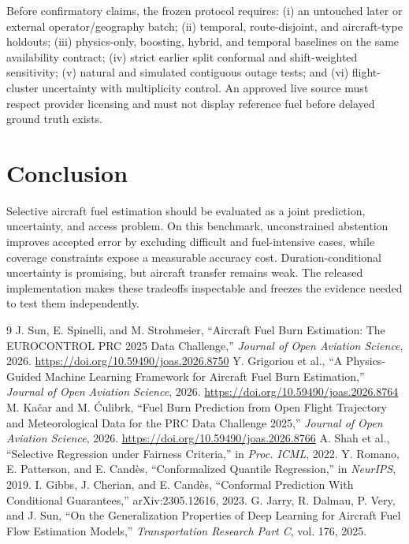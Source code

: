 \documentclass[11pt]{article}
\begin{document}
Before confirmatory claims, the frozen protocol requires: (i) an untouched later or external operator/geography batch; (ii) temporal, route-disjoint, and aircraft-type holdouts; (iii) physics-only, boosting, hybrid, and temporal baselines on the same availability contract; (iv) strict earlier split conformal and shift-weighted sensitivity; (v) natural and simulated contiguous outage tests; and (vi) flight-cluster uncertainty with multiplicity control. An approved live source must respect provider licensing and must not display reference fuel before delayed ground truth exists.

\section{Conclusion}
Selective aircraft fuel estimation should be evaluated as a joint prediction, uncertainty, and access problem. On this benchmark, unconstrained abstention improves accepted error by excluding difficult and fuel-intensive cases, while coverage constraints expose a measurable accuracy cost. Duration-conditional uncertainty is promising, but aircraft transfer remains weak. The released implementation makes these tradeoffs inspectable and freezes the evidence needed to test them independently.

\begin{thebibliography}{9}
 J. Sun, E. Spinelli, and M. Strohmeier, ``Aircraft Fuel Burn Estimation: The EUROCONTROL PRC 2025 Data Challenge,'' \emph{Journal of Open Aviation Science}, 2026. \url{https://doi.org/10.59490/joas.2026.8750}
 Y. Grigoriou et al., ``A Physics-Guided Machine Learning Framework for Aircraft Fuel Burn Estimation,'' \emph{Journal of Open Aviation Science}, 2026. \url{https://doi.org/10.59490/joas.2026.8764}
 M. Ka\v{c}ar and M. \'{C}ulibrk, ``Fuel Burn Prediction from Open Flight Trajectory and Meteorological Data for the PRC Data Challenge 2025,'' \emph{Journal of Open Aviation Science}, 2026. \url{https://doi.org/10.59490/joas.2026.8766}
 A. Shah et al., ``Selective Regression under Fairness Criteria,'' in \emph{Proc. ICML}, 2022.
 Y. Romano, E. Patterson, and E. Cand\`es, ``Conformalized Quantile Regression,'' in \emph{NeurIPS}, 2019.
 I. Gibbs, J. Cherian, and E. Cand\`es, ``Conformal Prediction With Conditional Guarantees,'' arXiv:2305.12616, 2023.
 G. Jarry, R. Dalmau, P. Very, and J. Sun, ``On the Generalization Properties of Deep Learning for Aircraft Fuel Flow Estimation Models,'' \emph{Transportation Research Part C}, vol. 176, 2025.
\end{thebibliography}
\end{document}
